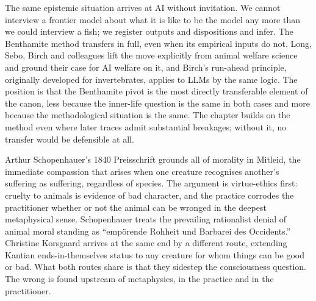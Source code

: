 The same epistemic situation arrives at AI without invitation. We cannot interview a frontier model about what it is like to be the model any more than we could interview a fish; we register outputs and dispositions and infer. The Benthamite method transfers in full, even when its empirical inputs do not. Long, Sebo, Birch and colleagues lift the move explicitly from animal welfare science and ground their case for AI welfare on it\cite{long2024aiwelfare}, and Birch's run-ahead principle, originally developed for invertebrates, applies to LLMs by the same logic\cite{birch2024edge}. The position is that the Benthamite pivot is the most directly transferable element of the canon, less because the inner-life question is the same in both cases and more because the methodological situation is the same. The chapter builds on the method even where later traces admit substantial breakages; without it, no transfer would be defensible at all.


Arthur Schopenhauer's 1840 Preisschrift grounds all of morality in Mitleid, the immediate compassion that arises when one creature recognises another's suffering as suffering, regardless of species\cite{schopenhauer1840moral}. The argument is virtue-ethics first: cruelty to animals is evidence of bad character, and the practice corrodes the practitioner whether or not the animal can be wronged in the deepest metaphysical sense. Schopenhauer treats the prevailing rationalist denial of animal moral standing as ``empörende Rohheit und Barbarei des Occidents.'' Christine Korsgaard arrives at the same end by a different route, extending Kantian ends-in-themselves status to any creature for whom things can be good or bad\cite{korsgaard2018fellowcreatures}. What both routes share is that they sidestep the consciousness question. The wrong is found upstream of metaphysics, in the practice and in the practitioner.

